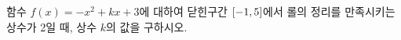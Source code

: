 함수 $f(x)=-x^2+kx+3$에 대하여 닫힌구간 $[-1{,}\mkern3mu\mathopen{}5]$에서 롤의 정리를 만족시키는 상수가 2일 때, 상수 $k$의 값을 구하시오.
